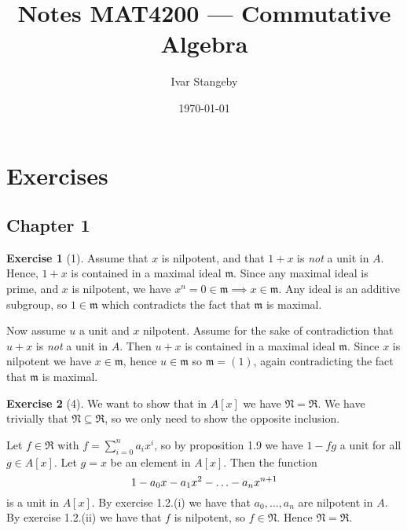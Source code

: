 \documentclass{article}
\title{Notes MAT4200 --- Commutative Algebra}
\author{Ivar Stangeby}
\date{\today}
\theoremstyle{definition}
\newtheorem*{exercise}{Exercise}
\begin{document}
\maketitle

\tableofcontents

\section{Exercises}
\label{sec:exercises_chapter_1}

\subsection{Chapter 1}
\label{sub:chapter_1}



\begin{exercise}[1]
    Assume that $x$ is nilpotent, and that $1 + x$ is \emph{not} a
    unit in $A$. Hence, $1 + x$ is contained in a maximal ideal
    $\mathfrak{m}$. Since any maximal ideal is prime, and $x$ is
    nilpotent, we have $x^n = 0 \in \mathfrak{m} \implies x \in
    \mathfrak{m}$. Any ideal is an additive subgroup, so $1 \in
    \mathfrak{m}$ which contradicts the fact that $\mathfrak{m}$ is
    maximal.

    Now assume $u$ a unit and $x$ nilpotent. Assume for the sake of
    contradiction that $u + x$ is \emph{not} a unit in $A$. Then $u +
    x$ is contained in a maximal ideal $\mathfrak{m}$. Since $x$ is
    nilpotent we have $x \in \mathfrak{m}$, hence $u \in \mathfrak{m}$
    so $\mathfrak{m} = (1)$, again contradicting the fact that
    $\mathfrak{m}$ is maximal.
\end{exercise}

\begin{exercise}[4]
    We want to show that in $A[x]$ we have $\mathfrak{N} =
    \mathfrak{R}$. We have trivially that $\mathfrak{N} \subseteq
    \mathfrak{R}$, so we only need to show the opposite inclusion.

    Let $f \in \mathfrak{R}$ with $f = \sum^{n}_{i=0} a_ix^i$, so by
    proposition 1.9 we have $1 - fg$ a unit for all $g \in A[x]$. Let
    $g = x$ be an element in $A[x]$. Then the function
    \begin{equation}
        \notag
        1 - a_0x - a_1x^2 - \ldots - a_nx^{n+1}
    \end{equation}
    is a unit in $A[x]$. By exercise 1.2.(i) we have that $a_0, \ldots
    ,a_n$ are nilpotent in $A$. By exercise 1.2.(ii) we have that $f$
    is nilpotent, so $f \in \mathfrak{N}$. Hence $\mathfrak{N} =
    \mathfrak{R}$.
\end{exercise}
\end{document}
